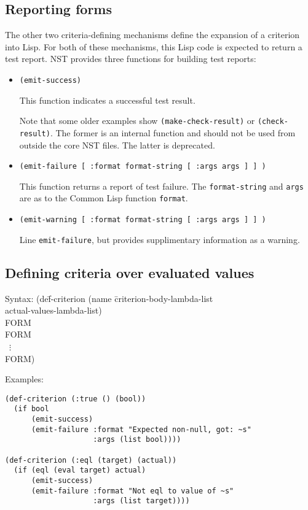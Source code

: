 \subsection{Reporting forms}
\label{sec:criteria-forms-report}
The other two criteria-defining mechanisms define the expansion of a
criterion into Lisp.  For both of these mechanisms, this Lisp code is
expected to return a test report.  NST provides three functions for
building test reports:
\begin{itemize}
\item\texttt{(emit-success)}\par This function indicates a successful
  test result.

  Note that some older examples show \texttt{(make-check-result)} or
  \texttt{(check-result)}.  The former is an internal function and
  should not be used from outside the core NST files.  The latter is
  deprecated.
\item\texttt{(emit-failure [ :format format-string [ :args args ] ] )}
  \par This function returns a report of test failure.  The
  \texttt{format-string} and \texttt{args} are as to the Common Lisp
  function \texttt{format}.
\item\texttt{(emit-warning [ :format format-string [ :args args ] ] )}
  \par Line \texttt{emit-failure}, but provides supplimentary
  information as a warning.
\end{itemize}

\subsection{Defining criteria over evaluated values}
\label{sec:def-criterion}
{\ttfamily\begin{tabbing}
\textrm{Syntax: }(de\=f-criterion (name \=criterion-body-lambda-list
\\ \>            \>actual-values-lambda-list)
\\ \> FORM
\\ \> FORM
\\ \> ~$\vdots$
\\ \> FORM)
\end{tabbing}}

Examples:
\begin{verbatim}
(def-criterion (:true () (bool))
  (if bool
      (emit-success)
      (emit-failure :format "Expected non-null, got: ~s"
                    :args (list bool))))

(def-criterion (:eql (target) (actual))
  (if (eql (eval target) actual)
      (emit-success)
      (emit-failure :format "Not eql to value of ~s"
                    :args (list target))))
\end{verbatim}

